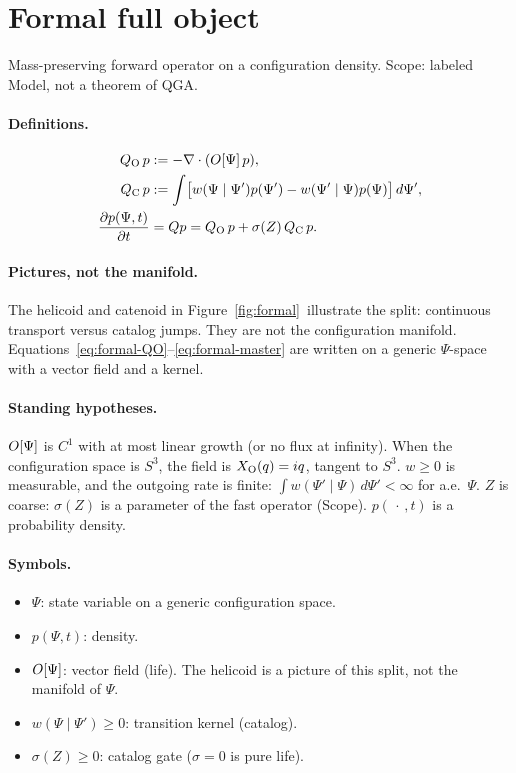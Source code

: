 \section{Formal full object}

\begin{model}
Mass-preserving forward operator on a configuration density.
Scope: labeled Model, not a theorem of QGA.
\end{model}

\paragraph{Definitions.}
\begin{align}
Q_{\mathrm{O}}\,p
&:= -\nabla\cdot(O[\Psi]\,p),
\label{eq:formal-QO}\\
Q_{\mathrm{C}}\,p
&:= \int\bigl[w(\Psi\mid\Psi')p(\Psi')
      -w(\Psi'\mid\Psi)p(\Psi)\bigr]\,d\Psi',
\label{eq:formal-QC}\\
\frac{\partial p(\Psi,t)}{\partial t}
&= Qp
= Q_{\mathrm{O}}\,p + \sigma(Z)\,Q_{\mathrm{C}}\,p.
\label{eq:formal-master}
\end{align}

\paragraph{Pictures, not the manifold.}
The helicoid and catenoid in Figure~\ref{fig:formal}\ illustrate the split:
continuous transport versus catalog jumps.
They are not the configuration manifold.
Equations~\eqref{eq:formal-QO}--\eqref{eq:formal-master} are written on a
generic \(\Psi\)-space with a vector field and a kernel.

\paragraph{Standing hypotheses.}
\(O[\Psi]\) is \(C^{1}\) with at most linear growth (or no flux at infinity).
When the configuration space is \(S^{3}\), the field is \(X_{\mathrm{O}}(q)=iq\),
tangent to \(S^{3}\).
\(w\ge 0\) is measurable, and the outgoing rate is finite:
\(\int w(\Psi'\mid\Psi)\,d\Psi'<\infty\) for a.e.\ \(\Psi\).
\(Z\) is coarse: \(\sigma(Z)\) is a parameter of the fast operator (Scope).
\(p(\,\cdot\,,t)\) is a probability density.

\paragraph{Symbols.}
\begin{itemize}[leftmargin=1.4em,itemsep=2pt,topsep=4pt,parsep=0pt]
  \item \(\Psi\): state variable on a generic configuration space.
  \item \(p(\Psi,t)\): density.
  \item \(O[\Psi]\): vector field (life). The helicoid is a picture of this split,
        not the manifold of \(\Psi\).
  \item \(w(\Psi\mid\Psi')\ge 0\): transition kernel (catalog).
  \item \(\sigma(Z)\ge 0\): catalog gate (\(\sigma=0\) is pure life).
\end{itemize}

